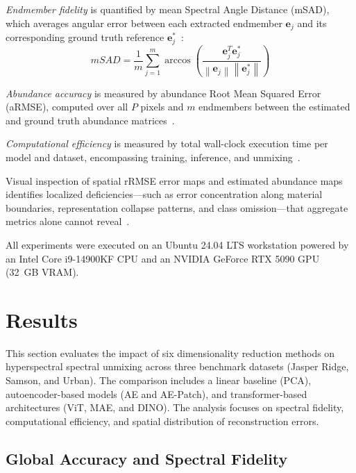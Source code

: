 \documentclass{article}
\begin{document}
\textit{Endmember fidelity} is quantified by mean Spectral Angle Distance (mSAD), which averages angular error between each extracted endmember $\mathbf{e}_j$ and its corresponding ground truth reference $\mathbf{e}_j^{*}$~\cite{ghosh2022transformer}:
\begin{equation}
    mSAD = \frac{1}{m} \sum_{j=1}^{m} \arccos \left( \frac{\mathbf{e}_j^T \mathbf{e}_j^{*}}{\left\| \mathbf{e}_j \right\| \left\| \mathbf{e}_j^{*} \right\|} \right)
    \label{eq:msad}
\end{equation}

\textit{Abundance accuracy} is measured by abundance Root Mean Squared Error (aRMSE), computed over all $P$ pixels and $m$ endmembers between the estimated and ground truth abundance matrices~\cite{gimenez2025hyperspectral}.

\textit{Computational efficiency} is measured by total wall-clock execution time per model and dataset, encompassing training, inference, and unmixing~\cite{vaddi2024}.

Visual inspection of spatial rRMSE error maps and estimated abundance maps identifies localized deficiencies—such as error concentration along material boundaries, representation collapse patterns, and class omission—that aggregate metrics alone cannot reveal~\cite{bioucas2012hyperspectral,ozkan2018endnet}.

All experiments were executed on an Ubuntu 24.04 LTS workstation powered by an Intel Core i9-14900KF CPU and an NVIDIA GeForce RTX 5090 GPU (32~GB VRAM).





\section{Results}
\label{sec:results}
This section evaluates the impact of six dimensionality reduction methods on hyperspectral spectral unmixing across three benchmark datasets (Jasper Ridge, Samson, and Urban). The comparison includes a linear baseline (PCA), autoencoder-based models (AE and AE-Patch), and transformer-based architectures (ViT, MAE, and DINO). The analysis focuses on spectral fidelity, computational efficiency, and spatial distribution of reconstruction errors.

\subsection{Global Accuracy and Spectral Fidelity}
\label{subsec:quantitative_analysis}
\end{document}
